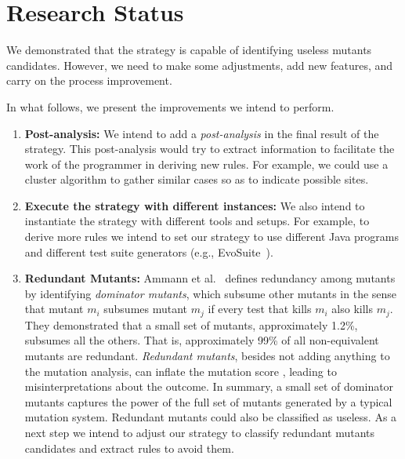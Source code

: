 \section{Research Status}
\label{sec:research-status-strategy}

We demonstrated that the strategy is capable of identifying useless mutants candidates.
However, we need to make some adjustments, add new features, and carry on the process improvement.

In what follows, we present the improvements we intend to perform.

\begin{enumerate}
    \item \textbf{Post-analysis: }We intend to add a \textit{post-analysis} in the final result of the strategy.
This post-analysis would try to extract information to facilitate the work of the programmer in deriving new rules.
For example, we could use a cluster algorithm to gather similar cases so as to indicate possible sites.
    \item \textbf{Execute the strategy with different instances: }We also intend to instantiate the strategy with different tools and setups.
For example, to derive more rules we intend to set our strategy to use different Java programs and different test suite generators (e.g., EvoSuite~\cite{FRASER:2011:1}).
    \item \textbf{Redundant Mutants: }Ammann et al.~\cite{AMMAN:2014:1} defines redundancy among mutants by identifying \textit{dominator mutants}, which subsume other mutants in the sense that mutant $m_i$ subsumes mutant $m_j$ if every test that kills $m_i$ also kills $m_j$. 
They demonstrated that a small set of mutants, approximately 1.2\%, subsumes all the others.
That is, approximately 99\% of all non-equivalent mutants are redundant.
\textit{Redundant mutants}, besides not adding anything to the mutation analysis, can inflate the mutation score \cite{PAPADAKIS:2016:1}, leading to misinterpretations about the outcome.
In summary, a small set of dominator mutants captures the power of the full set of mutants generated by a typical mutation system.
Redundant mutants could also be classified as useless.
As a next step we intend to adjust our strategy to classify redundant mutants candidates and extract rules to avoid them.
\end{enumerate}




